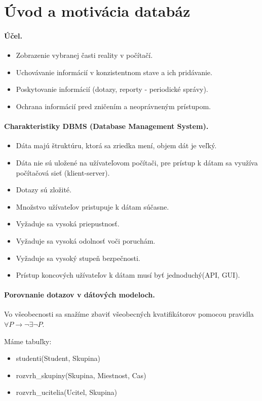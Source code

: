 \documentclass[10pt,a4paper]{article}
\begin{document}
\section*{Úvod a motivácia databáz}
\paragraph{Účel.}
\begin{itemize}
\item Zobrazenie vybranej časti reality v počítačí.
\item Uchovávanie informácií v konzistentnom stave a ich pridávanie.
\item Poskytovanie informácií (dotazy, reporty - periodické správy).
\item Ochrana informácií pred zničením a neoprávneným prístupom.
\end{itemize}

\paragraph{Charakteristiky DBMS (Database Management System).}
\begin{itemize}
\item Dáta majú štruktúru, ktorá sa zriedka mení, objem dát je veľký.
\item Dáta nie sú uložené na užívateľovom počítači, pre prístup k dátam sa využíva počítačová sieť (klient-server).
\item Dotazy sú zložité.
\item Množstvo užívateľov pristupuje k dátam súčasne.
\item Vyžaduje sa vysoká priepustnosť.
\item Vyžaduje sa vysoká odolnosť voči poruchám.
\item Vyžaduje sa vysoký stupeň bezpečnosti.
\item Prístup koncových užívateľov k dátam musí byť jednoduchý(API, GUI).
\end{itemize}

\paragraph{Porovnanie dotazov v dátových modeloch.}
Vo všeobecnosti sa snažíme zbaviť všeobecných kvatifikátorov pomocou pravidla $\forall P \rightarrow \neg \exists \neg P$.

Máme tabuľky:
\begin{itemize}
\item studenti(Student, Skupina)
\item rozvrh\_skupiny(Skupina, Miestnost, Cas)
\item rozvrh\_ucitelia(Ucitel, Skupina)
\end{itemize}
\end{document}
